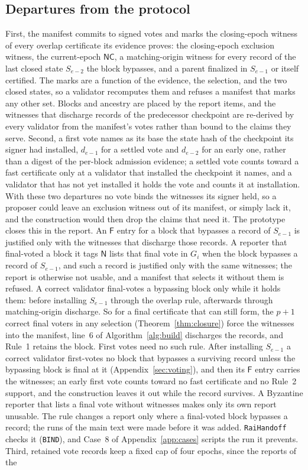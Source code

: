 \documentclass[conference]{IEEEtran}
\newcommand{\NC}{\mathsf{NC}}
\newcommand{\tagN}{\mathsf{N}}
\newcommand{\tagF}{\mathsf{F}}
\begin{document}
\subsection{Departures from the protocol}
First, the manifest commits to signed votes and marks the closing-epoch witness of every overlap certificate its evidence proves: the closing-epoch exclusion witness, the current-epoch $\NC$, a matching-origin witness for every record of the last closed state $S_{e-2}$ the block bypasses, and a parent finalized in $S_{e-1}$ or itself certified. The marks are a function of the evidence, the selection, and the two closed states, so a validator recomputes them and refuses a manifest that marks any other set. Blocks and ancestry are placed by the report items, and the witnesses that discharge records of the predecessor checkpoint are re-derived by every validator from the manifest's votes rather than bound to the claims they serve. Second, a first vote names as its base the state hash of the checkpoint its signer had installed, $d_{e-1}$ for a settled vote and $d_{e-2}$ for an early one, rather than a digest of the per-block admission evidence; a settled vote counts toward a fast certificate only at a validator that installed the checkpoint it names, and a validator that has not yet installed it holds the vote and counts it at installation. With these two departures no vote binds the witnesses its signer held, so a proposer could leave an exclusion witness out of its manifest, or simply lack it, and the construction would then drop the claims that need it. The prototype closes this in the report. An $\tagF$ entry for a block that bypasses a record of $S_{e-1}$ is justified only with the witnesses that discharge those records. A reporter that final-voted a block it tags $\tagN$ lists that final vote in $G_i$ when the block bypasses a record of $S_{e-1}$, and such a record is justified only with the same witnesses; the report is otherwise not usable, and a manifest that selects it without them is refused. A correct validator final-votes a bypassing block only while it holds them: before installing $S_{e-1}$ through the overlap rule, afterwards through matching-origin discharge. So for a final certificate that can still form, the $p+1$ correct final voters in any selection (Theorem~\ref{thm:closure}) force the witnesses into the manifest, line~6 of Algorithm~\ref{alg:build} discharges the records, and Rule~1 retains the block. First votes need no such rule. After installing $S_{e-1}$ a correct validator first-votes no block that bypasses a surviving record unless the bypassing block is final at it (Appendix~\ref{sec:voting}), and then its $\tagF$ entry carries the witnesses; an early first vote counts toward no fast certificate and no Rule~2 support, and the construction leaves it out while the record survives. A Byzantine reporter that lists a final vote without witnesses makes only its own report unusable. The rule changes a report only where a final-voted block bypasses a record; the runs of the main text were made before it was added. \texttt{RaiHandoff} checks it (\texttt{BIND}), and Case~8 of Appendix~\ref{app:cases} scripts the run it prevents. Third, retained vote records keep a fixed cap of four epochs, since the reports of the 
\end{document}
